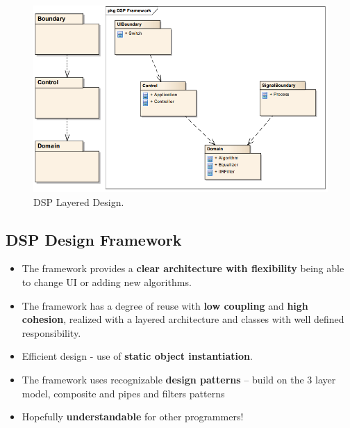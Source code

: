 \begin{figure} [H]
	\centering
	\includegraphics[width=\linewidth]{graphics/22.png}
	\caption{DSP Layered Design.}
	\label{fig:22}
\end{figure}


\subsection{DSP Design Framework}
\begin{itemize}
	\item The framework provides a \textbf{clear architecture with flexibility} being able to change UI or adding new	algorithms.
	\item The framework has a degree of reuse with \textbf{low coupling} and \textbf{high cohesion}, realized with a layered architecture and classes with well defined responsibility.
	\item Efficient design - use of \textbf{static object instantiation}.
	\item The framework uses recognizable \textbf{design patterns} – build on the 3 layer model, composite and pipes and filters patterns
	\item Hopefully \textbf{understandable} for other programmers!
\end{itemize}


